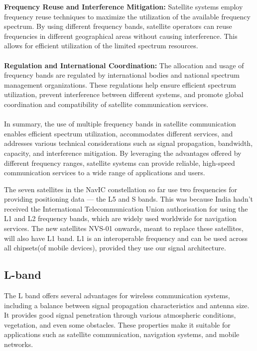 \textbf{Frequency Reuse and Interference Mitigation:} Satellite systems employ frequency reuse techniques to maximize the utilization of the available frequency spectrum. By using different frequency bands, satellite operators can reuse frequencies in different geographical areas without causing interference. This allows for efficient utilization of the limited spectrum resources.
\\
\\
\textbf{Regulation and International Coordination:} The allocation and usage of frequency bands are regulated by international bodies and national spectrum management organizations. These regulations help ensure efficient spectrum utilization, prevent interference between different systems, and promote global coordination and compatibility of satellite communication services.
\\
\\
In summary, the use of multiple frequency bands in satellite communication enables efficient spectrum utilization, accommodates different services, and addresses various technical considerations such as signal propagation, bandwidth, capacity, and interference mitigation. By leveraging the advantages offered by different frequency ranges, satellite systems can provide reliable, high-speed communication services to a wide range of applications and users.

\noindent The seven satellites in the NavIC constellation so far use two frequencies for providing positioning data — the L5 and S bands. This was because India hadn't received the International Telecommunication Union authorisation for using the L1 and L2 frequency bands, which are widely used worldwide for navigation services. The new satellites NVS-01 onwards, meant to replace these satellites, will also have L1 band. L1 is an interoperable frequency and can be used across all chipsets(of mobile devices), provided they use our signal architecture.

\subsection{L-band}
The L band offers several advantages for wireless communication systems, including a balance between signal propagation characteristics and antenna size. It provides good signal penetration through various atmospheric conditions, vegetation, and even some obstacles. These properties make it suitable for applications such as satellite communication, navigation systems, and mobile networks.

